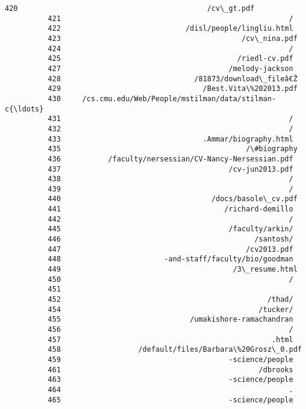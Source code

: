\documentclass[11pt]{article}
\begin{document}
\begin{Verbatim}[commandchars=\\\{\}]
          420                                            /cv\_gt.pdf
          421                                                     /
          422                             /disl/people/lingliu.html
          423                                          /cv\_nina.pdf
          424                                                     /
          425                                         /riedl-cv.pdf
          427                                       /melody-jackson
          428                               /81873/download\_fileâ€Ž
          429                                 /Best.Vita\%202013.pdf
          430     /cs.cmu.edu/Web/People/mstilman/data/stilman-c{\ldots}
          431                                                     /
          432                                                     /
          433                                 .Ammar/biography.html
          435                                           /\#biography
          436           /faculty/nersessian/CV-Nancy-Nersessian.pdf
          437                                       /cv-jun2013.pdf
          438                                                     /
          439                                                     /
          440                                   /docs/basole\_cv.pdf
          441                                      /richard-demillo
          442                                                     /
          445                                       /faculty/arkin/
          446                                             /santosh/
          447                                           /cv2013.pdf
          448                        -and-staff/faculty/bio/goodman
          449                                        /3\_resume.html
          450                                                     /
          451                                                      
          452                                                /thad/
          454                                              /tucker/
          455                              /umakishore-ramachandran
          456                                                     /
          457                                                 .html
          458                  /default/files/Barbara\%20Grosz\_0.pdf
          459                                       -science/people
          461                                              /dbrooks
          463                                       -science/people
          464                                                     .
          465                                       -science/people

\end{Verbatim}
\end{document}
